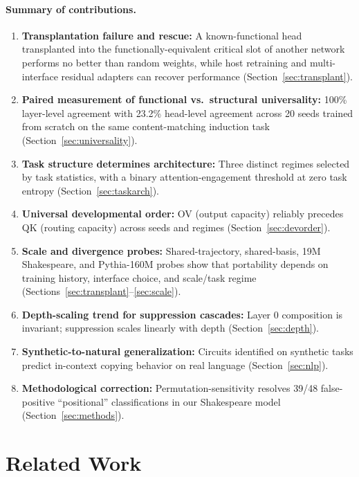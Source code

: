 \documentclass[final]{article}
\begin{document}
\paragraph{Summary of contributions.}
\begin{enumerate}
\item \textbf{Transplantation failure and rescue:} A known-functional head
      transplanted into the functionally-equivalent critical slot of another
      network performs no better than random weights, while host retraining and
      multi-interface residual adapters can recover performance
      (Section~\ref{sec:transplant}).
\item \textbf{Paired measurement of functional vs.\ structural universality:}
      100\% layer-level agreement with 23.2\% head-level agreement across 20
      seeds trained from scratch on the same content-matching induction task
      (Section~\ref{sec:universality}).
\item \textbf{Task structure determines architecture:} Three distinct regimes
      selected by task statistics, with a binary attention-engagement threshold
      at zero task entropy (Section~\ref{sec:taskarch}).
\item \textbf{Universal developmental order:} OV (output capacity) reliably
      precedes QK (routing capacity) across seeds and regimes
      (Section~\ref{sec:devorder}).
\item \textbf{Scale and divergence probes:} Shared-trajectory, shared-basis,
      19M Shakespeare, and Pythia-160M probes show that portability depends on
      training history, interface choice, and scale/task regime
      (Sections~\ref{sec:transplant}--\ref{sec:scale}).
\item \textbf{Depth-scaling trend for suppression cascades:} Layer 0 composition
      is invariant; suppression scales linearly with depth
      (Section~\ref{sec:depth}).
\item \textbf{Synthetic-to-natural generalization:} Circuits identified on
      synthetic tasks predict in-context copying behavior on real language
      (Section~\ref{sec:nlp}).
\item \textbf{Methodological correction:} Permutation-sensitivity resolves
      39/48 false-positive ``positional'' classifications in our Shakespeare
      model (Section~\ref{sec:methods}).
\end{enumerate}

\section{Related Work}
\label{sec:related}
\end{document}

